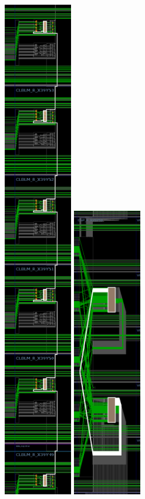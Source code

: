 \documentclass[twocolumn]{article}
\begin{document}
            \begin{figure}
                \centering
                \includegraphics[width=3.0cm]{figures/carry_chain_routes.png}
                \includegraphics[width=3.0cm]{figures/dsp_cascade_routes.png}

\end{figure}
\end{document}
